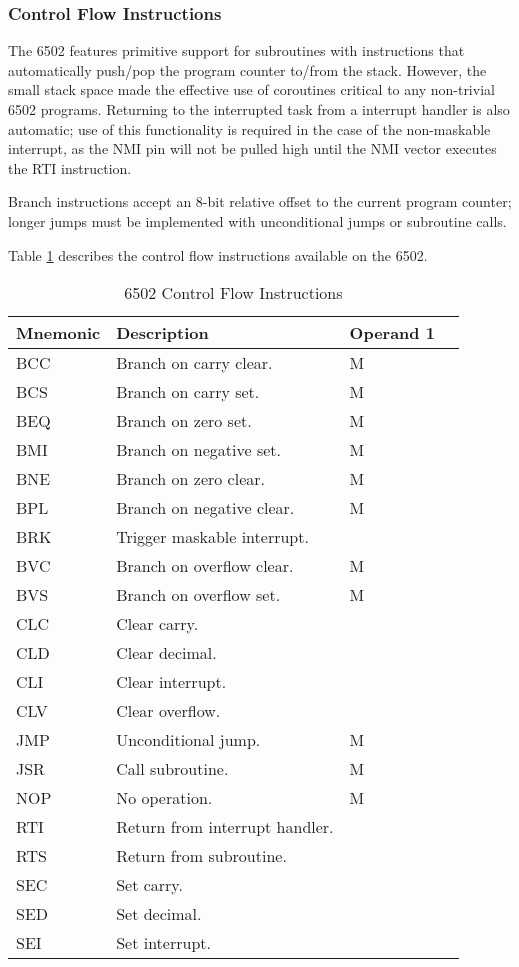 \documentclass[journal]{IEEEtran}
\begin{document}
\subsubsection{Control Flow Instructions}

The 6502 features primitive support for subroutines with instructions that
automatically push/pop the program counter to/from the stack. However, the small
stack space made the effective use of coroutines critical to any non-trivial
6502 programs. Returning to the interrupted task from a interrupt handler is
also automatic; use of this functionality is required in the case of the
non-maskable interrupt, as the NMI pin will not be pulled high until the NMI
vector executes the RTI instruction.

Branch instructions accept an 8-bit relative offset to the current program
counter; longer jumps must be implemented with unconditional jumps or subroutine
calls.

Table \ref{control} describes the control flow instructions available on the
6502.

\begin{table}
\centering
\begin{tabular}[H!]{|l|l|l|l|}
\hline
\textbf{Mnemonic} & \textbf{Description} & \textbf{Operand 1} \\
\hline
BCC & Branch on carry clear. & M \\
BCS & Branch on carry set. & M \\
BEQ & Branch on zero set. & M \\
BMI & Branch on negative set. & M \\
BNE & Branch on zero clear. & M \\
BPL & Branch on negative clear. & M \\
BRK & Trigger maskable interrupt. & \\
BVC & Branch on overflow clear. & M \\
BVS & Branch on overflow set. & M \\
CLC & Clear carry. & \\
CLD & Clear decimal. & \\
CLI & Clear interrupt. & \\
CLV & Clear overflow. & \\
JMP & Unconditional jump. & M \\
JSR & Call subroutine. & M \\
NOP & No operation. & M \\
RTI & Return from interrupt handler. & \\
RTS & Return from subroutine. & \\
SEC & Set carry. & \\
SED & Set decimal. & \\
SEI & Set interrupt. & \\
\hline
\end{tabular}
\caption{6502 Control Flow Instructions}
\label{control}
\end{table}
\end{document}
